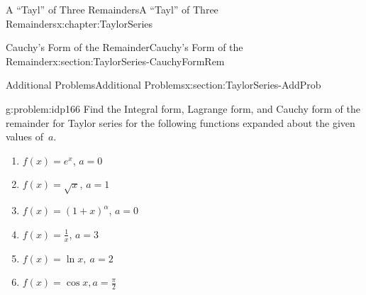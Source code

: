 \begin{chapterptx}{A ``Tayl'' of Three Remainders}{}{A ``Tayl'' of Three Remainders}{}{}{x:chapter:TaylorSeries}
\begin{sectionptx}{Cauchy's Form of the Remainder}{}{Cauchy's Form of the Remainder}{}{}{x:section:TaylorSeries-CauchyFormRem}
	\end{sectionptx}
	\typeout{************************************************}
	\typeout{************************************************}
	\begin{sectionptx}{Additional Problems}{}{Additional Problems}{}{}{x:section:TaylorSeries-AddProb}
		\begin{problem}{}{g:problem:idp166}%
			Find the Integral form, Lagrange form, and Cauchy form of the remainder for Taylor series for the following functions expanded about the given values of \(\,a\).%
			\begin{enumerate}[font=\bfseries,label=(\alph*),ref=\alph*]
				\item{}\(f(x)=e^x\), \(a=0\)%
				\item{}\(f(x)=\sqrt{x}\), \(a=1\)%
				\item{}\(f(x)=(1+x)^\alpha\), \(a=0\)%
				\item{}\(f(x)=\frac{1}{x}\), \(a=3\)%
				\item{}\(f(x)=\ln x,\ a=2\)%
				\item{}\(f(x)=\cos x, a=\frac{\pi}{2}\)%
			\end{enumerate}
		\end{problem}
	\end{sectionptx}
\end{chapterptx}
%
%